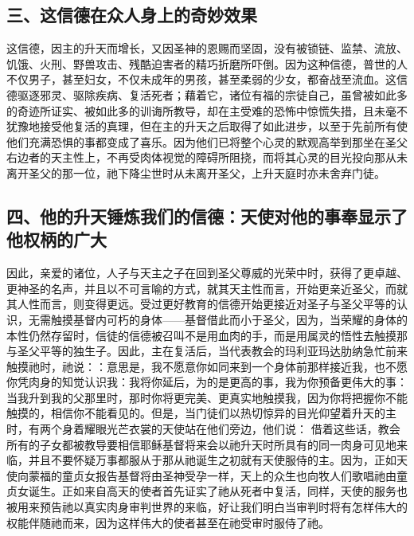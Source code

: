
\subsection{三、这信德在众人身上的奇妙效果}

这信德，因主的升天而增长，又因圣神的恩赐而坚固，没有被锁链、监禁、流放、饥饿、火刑、野兽攻击、残酷迫害者的精巧折磨所吓倒。因为这种信德，普世的人不仅男子，甚至妇女，不仅未成年的男孩，甚至柔弱的少女，都奋战至流血。这信德驱逐邪灵、驱除疾病、复活死者；藉着它，诸位有福的宗徒自己，虽曾被如此多的奇迹所证实、被如此多的训诲所教导，却在主受难的恐怖中惊慌失措，且未毫不犹豫地接受他复活的真理，但在主的升天之后取得了如此进步，以至于先前所有使他们充满恐惧的事都变成了喜乐。因为他们已将整个心灵的默观高举到那坐在圣父右边者的天主性上，不再受肉体视觉的障碍所阻挠，而将其心灵的目光投向那从未离开圣父的那一位，祂下降尘世时从未离开圣父，上升天庭时亦未舍弃门徒。\par


\subsection{四、他的升天锤炼我们的信德：天使对他的事奉显示了他权柄的广大}

因此，亲爱的诸位，人子与天主之子在回到圣父尊威的光荣中时，获得了更卓越、更神圣的名声，并且以不可言喻的方式，就其天主性而言，开始更亲近圣父，而就其人性而言，则变得更远。受过更好教育的信德开始更接近对圣子与圣父平等的认识，无需触摸基督内可朽的身体——基督借此而小于圣父，因为，当荣耀的身体的本性仍然存留时，信徒的信德被召叫不是用血肉的手，而是用属灵的悟性去触摸那与圣父平等的独生子。因此，主在复活后，当代表教会的玛利亚玛达肋纳急忙前来触摸祂时，祂说：：意思是，我不愿意你如同来到一个身体前那样接近我，也不愿你凭肉身的知觉认识我：我将你延后，为的是更高的事，我为你预备更伟大的事：当我升到我的父那里时，那时你将更完美、更真实地触摸我，因为你将把握你不能触摸的，相信你不能看见的。但是，当门徒们以热切惊异的目光仰望着升天的主时，有两个身着耀眼光芒衣裳的天使站在他们旁边，他们说： 借着这些话，教会所有的子女都被教导要相信耶稣基督将来会以祂升天时所具有的同一肉身可见地来临，并且不要怀疑万事都服从于那从祂诞生之初就有天使服侍的主。因为，正如天使向蒙福的童贞女报告基督将由圣神受孕一样，天上的众生也向牧人们歌唱祂由童贞女诞生。正如来自高天的使者首先证实了祂从死者中复活，同样，天使的服务也被用来预告祂以真实肉身审判世界的来临，好让我们明白当审判时将有怎样伟大的权能伴随祂而来，因为这样伟大的使者甚至在祂受审时服侍了祂。\par

